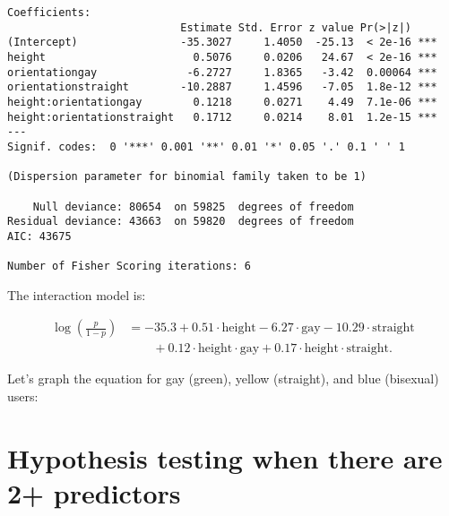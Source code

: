 \documentclass{beamer}\usepackage[]{graphicx}\usepackage[]{color}
\makeatletter
\newenvironment{kframe}{%
 \def\at@end@of@kframe{}%
 \ifinner\ifhmode%
  \def\at@end@of@kframe{\end{minipage}}%
  \begin{minipage}{\columnwidth}%
 \fi\fi%
 \def\FrameCommand##1{\hskip\@totalleftmargin \hskip-\fboxsep
 \colorbox{shadecolor}{##1}\hskip-\fboxsep
     \hskip-\linewidth \hskip-\@totalleftmargin \hskip\columnwidth}%
 \MakeFramed {\advance\hsize-\width
   \@totalleftmargin\z@ \linewidth\hsize
   \@setminipage}}%
 {\par\unskip\endMakeFramed%
 \at@end@of@kframe}
\newenvironment{knitrout}{}{} %
\makeatother
\begin{document}
\begin{darkframes}
\begin{frame}[fragile]
\begin{knitrout}
\begin{kframe}
\begin{verbatim}
Coefficients:
                           Estimate Std. Error z value Pr(>|z|)    
(Intercept)                -35.3027     1.4050  -25.13  < 2e-16 ***
height                       0.5076     0.0206   24.67  < 2e-16 ***
orientationgay              -6.2727     1.8365   -3.42  0.00064 ***
orientationstraight        -10.2887     1.4596   -7.05  1.8e-12 ***
height:orientationgay        0.1218     0.0271    4.49  7.1e-06 ***
height:orientationstraight   0.1712     0.0214    8.01  1.2e-15 ***
---
Signif. codes:  0 '***' 0.001 '**' 0.01 '*' 0.05 '.' 0.1 ' ' 1

(Dispersion parameter for binomial family taken to be 1)

    Null deviance: 80654  on 59825  degrees of freedom
Residual deviance: 43663  on 59820  degrees of freedom
AIC: 43675

Number of Fisher Scoring iterations: 6
\end{verbatim}
\end{kframe}
\end{knitrout}
    \end{frame}

    \begin{frame}
      The interaction model is:

      \begin{align*}
        \log\left(\frac{p}{1-p}\right) &=
          -35.3 +
          0.51\cdot\text{height}
          - 6.27\cdot\text{gay}
          - 10.29\cdot\text{straight} \\ & \qquad+
          0.12\cdot\text{height}\cdot\text{gay} +
          0.17\cdot\text{height}\cdot\text{straight}.
      \end{align*}
    \end{frame}

    \begin{frame}
      Let's graph the equation for gay (green), yellow (straight), and blue (bisexual) users:
\begin{knitrout}


\end{knitrout}
    \end{frame}

    \section{Hypothesis testing when there are 2+ predictors}


\end{darkframes}
\end{document}
